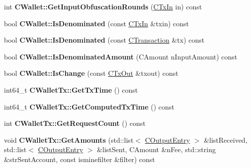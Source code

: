 \begin{DoxyCompactItemize}
\item 
\mbox{\label{group__map_wallet_ga2499e2b6e6a5bcdd4da4c30c5705329f}} 
int {\bfseries C\+Wallet\+::\+Get\+Input\+Obfuscation\+Rounds} (\mbox{\hyperlink{class_c_tx_in}{C\+Tx\+In}} in) const
\item 
\mbox{\label{group__map_wallet_gaadbae9ed508f11c3c2cd4c5a3ecc3477}} 
bool {\bfseries C\+Wallet\+::\+Is\+Denominated} (const \mbox{\hyperlink{class_c_tx_in}{C\+Tx\+In}} \&txin) const
\item 
\mbox{\label{group__map_wallet_ga4c1d5a34a9ae641a3a68c406e3bede25}} 
bool {\bfseries C\+Wallet\+::\+Is\+Denominated} (const \mbox{\hyperlink{class_c_transaction}{C\+Transaction}} \&tx) const
\item 
\mbox{\label{group__map_wallet_ga070aa9135ca31d630fa798a868c0b59c}} 
bool {\bfseries C\+Wallet\+::\+Is\+Denominated\+Amount} (C\+Amount n\+Input\+Amount) const
\item 
\mbox{\label{group__map_wallet_gaba1c6108b7d2d3800dd487bab4c4c82e}} 
bool {\bfseries C\+Wallet\+::\+Is\+Change} (const \mbox{\hyperlink{class_c_tx_out}{C\+Tx\+Out}} \&txout) const
\item 
\mbox{\label{group__map_wallet_gab94368cf0553687d8f1fec5d2aaa1457}} 
int64\+\_\+t {\bfseries C\+Wallet\+Tx\+::\+Get\+Tx\+Time} () const
\item 
\mbox{\label{group__map_wallet_ga64b7c70c7da6241f3d9dffac31503921}} 
int64\+\_\+t {\bfseries C\+Wallet\+Tx\+::\+Get\+Computed\+Tx\+Time} () const
\item 
\mbox{\label{group__map_wallet_gafd3ca5b54d33038a06189f3f27a97910}} 
int {\bfseries C\+Wallet\+Tx\+::\+Get\+Request\+Count} () const
\item 
\mbox{\label{group__map_wallet_ga75c673700a9d5fa2b0ab63bfd094b045}} 
void {\bfseries C\+Wallet\+Tx\+::\+Get\+Amounts} (std\+::list$<$ \mbox{\hyperlink{struct_c_output_entry}{C\+Output\+Entry}} $>$ \&list\+Received, std\+::list$<$ \mbox{\hyperlink{struct_c_output_entry}{C\+Output\+Entry}} $>$ \&list\+Sent, C\+Amount \&n\+Fee, std\+::string \&str\+Sent\+Account, const isminefilter \&filter) const

\end{DoxyCompactItemize}
